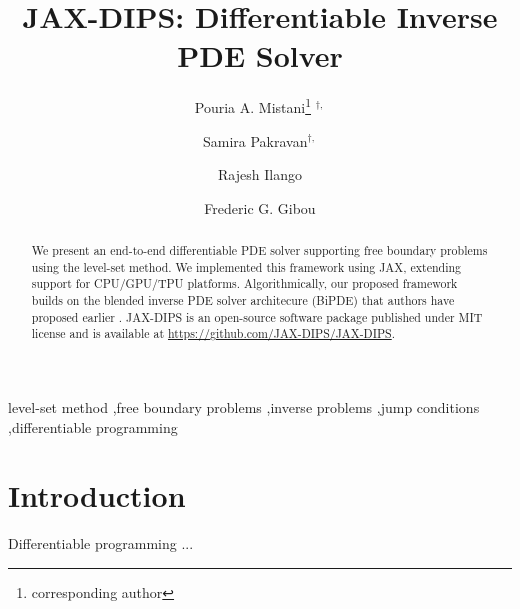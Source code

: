 \documentclass{elsarticle}
\begin{document}
\title{JAX-DIPS: Differentiable Inverse PDE Solver}



\author[1]{Pouria A. Mistani\thanks{corresponding author} $^{\dagger,}$}
\author[2]{Samira Pakravan$^{\dagger,}$}
\author[1]{Rajesh Ilango}
\author[2]{Frederic G. Gibou}

\address[1]{NVIDIA Corporation, Santa Clara, CA 95051, USA}
\address[2]{University of California, Santa Barbara, CA 93106-5070, USA}

\begin{abstract}
We present an end-to-end differentiable PDE solver supporting free boundary problems using the level-set method. We implemented this framework using JAX, extending support for CPU/GPU/TPU platforms. Algorithmically, our proposed framework builds on the blended inverse PDE solver architecure (BiPDE) that authors have proposed earlier \cite{pakravan2021solving}. JAX-DIPS is an open-source software package published under MIT license and is available at \href{https://github.com/JAX-DIPS/JAX-DIPS}{https://github.com/JAX-DIPS/JAX-DIPS}.

\end{abstract}

\begin{keyword}
level-set method \sep free boundary problems \sep inverse problems \sep jump conditions \sep differentiable programming 
\end{keyword}

\maketitle
\def\thefootnote{$\dagger$}







\section{Introduction}
\label{sec::introduction}
Differentiable programming ...
\end{document}
